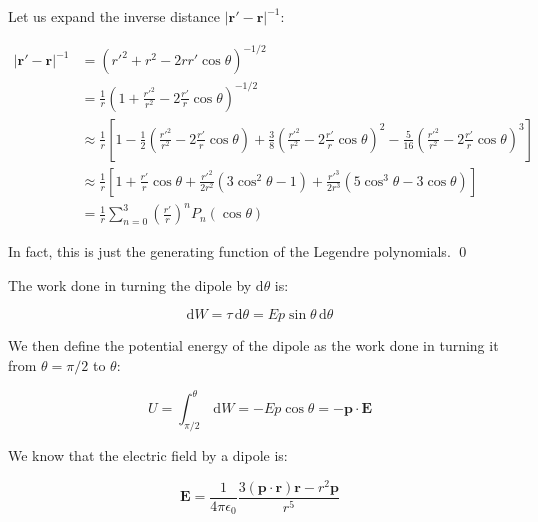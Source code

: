 \documentclass[12pt]{article}
\begin{document}
Let us expand the inverse distance $\left\lvert \mathbf{r}' - \mathbf{r} \right\rvert^{-1}$:

\begin{equation}
    \begin{split}
        \left\lvert \mathbf{r}' - \mathbf{r} \right\rvert^{-1} &= \left( r'^2 + r^2 - 2rr' \cos{\theta} \right)^{-1/2} \\
        &= \frac{1}{r} \left( 1 + \frac{r'^{2}}{r^{2}}  - 2 \frac{r'}{r} \cos{\theta} \right)^{-1/2} \\
        &\approx \frac{1}{r} \left[ 1 - \frac{1}{2} \left( \frac{r'^{2}}{r^{2}}  - 2 \frac{r'}{r} \cos{\theta} \right) + \frac{3}{8} \left( \frac{r'^{2}}{r^{2}}  - 2 \frac{r'}{r} \cos{\theta} \right)^{2} - \frac{5}{16} \left( \frac{r'^{2}}{r^{2}}  - 2 \frac{r'}{r} \cos{\theta} \right)^{3} \right] \\
        &\approx \frac{1}{r} \left[ 1 + \frac{r'}{r} \cos{\theta} + \frac{r'^{2}}{2r^{2}} \left( 3 \cos^{2}{\theta} - 1 \right) + \frac{r'^{3}}{2r^{3}} \left( 5 \cos^{3}{\theta} - 3 \cos{\theta} \right) \right] \\
        &= \frac{1}{r} \sum_{n=0}^{3} \left( \frac{r'}{r} \right)^{n} P_{n}(\cos{\theta})
    \end{split}
\end{equation}

In fact, this is just the generating function of the Legendre polynomials.
\qed



The work done in turning the dipole by $\mathrm{d}\theta$ is:

\begin{equation}
    \mathrm{d}W = \tau \, \mathrm{d}\theta = Ep \sin{\theta} \, \mathrm{d}\theta
\end{equation}

We then define the potential energy of the dipole as the work done in turning it from $\theta = \pi/2$ to $\theta$:

\begin{equation}
    U = \int_{\pi/2}^{\theta} \, \mathrm{d}W = -Ep \cos{\theta} = -\mathbf{p} \cdot \mathbf{E}
\end{equation}

We know that the electric field by a dipole is:

\begin{equation}
    \mathbf{E} = \frac{1}{4\pi\epsilon_{0}} \frac{3(\mathbf{p} \cdot \mathbf{r}) \mathbf{r} - r^{2} \mathbf{p}}{r^{5}}
\end{equation}
\end{document}
